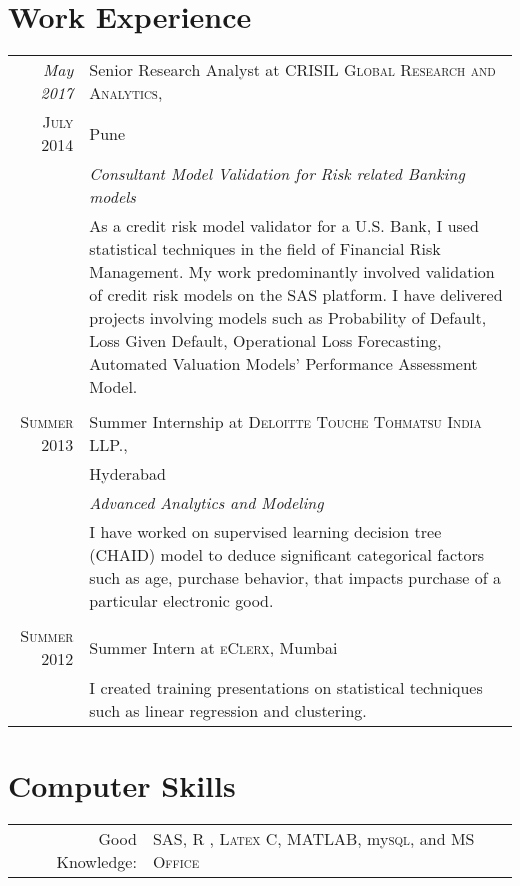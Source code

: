 \documentclass[a4paper,10pt]{article}
\begin{document}
\section{Work Experience}
\begin{tabular}{r|p{11cm}}
 \emph{May 2017} & Senior Research Analyst at \textsc{CRISIL Global Research and Analytics}, \\\textsc{July 2014}&Pune \\&\emph{Consultant Model Validation for Risk related Banking models}\\&\footnotesize{As a credit risk model validator for a U.S. Bank, I used statistical techniques in the field of Financial Risk Management. My work predominantly involved validation of credit risk models on the SAS platform. I have delivered projects involving models such as Probability of Default, Loss Given Default, Operational Loss Forecasting, Automated Valuation Models' Performance Assessment Model.}\\\multicolumn{2}{c}{} \\
 \textsc{Summer 2013} & Summer Internship at \textsc{Deloitte Touche Tohmatsu India LLP.}, \\ & Hyderabad \\&\emph{Advanced Analytics and Modeling}\\&\footnotesize{I have worked on supervised learning decision tree (CHAID) model to deduce significant categorical factors such as age, purchase behavior, that impacts purchase of a particular electronic good.}\\\multicolumn{2}{c}{} \\
\textsc{Summer 2012} & Summer Intern at \textsc{eClerx}, Mumbai \emph{}\\&\footnotesize{I created training presentations on statistical techniques such as linear regression and clustering.}
\end{tabular}

\section{Computer Skills}
\begin{tabular}{rl}
 Good Knowledge:& \textsc{SAS}, \textsc{R} , \textsc{Latex} \textsc{C},  \textsc{MATLAB}, my\textsc{sql}, and \textsc{MS Office} \setmainfont[SmallCapsFont=Fontin-SmallCaps.otf]{Fontin.otf}\\
\end{tabular}



\end{document}
